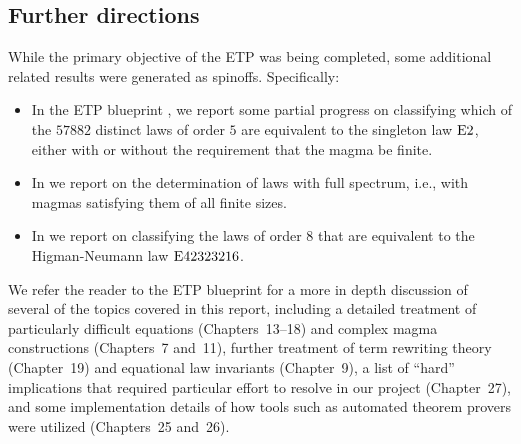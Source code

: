 \subsection{Further directions}

While the primary objective of the ETP was being completed, some additional related results were generated as spinoffs.  Specifically:
\begin{itemize}
\item In the ETP blueprint \cite[Chapter~20]{ETP_blueprint}, we report some partial progress on classifying which of the $\num{57882}$ distinct laws of order $5$ are equivalent to the singleton law $\mathrm{E}2$, either with or without the requirement that the magma be finite.
\item In  we report on the determination of laws with full spectrum, i.e., with magmas satisfying them of all finite sizes.
\item In  we report on classifying the laws of order $8$ that are equivalent to the Higman-Neumann law $\mathrm{E}42323216$.
\end{itemize}

We refer the reader to the ETP blueprint \cite{ETP_blueprint} for a more in depth discussion of several of the topics covered in this report, including a detailed treatment of particularly difficult equations (Chapters~13--18) and complex magma constructions (Chapters~7 and~11), further treatment of term rewriting theory (Chapter~19) and equational law invariants (Chapter~9), a list of ``hard'' implications that required particular effort to resolve in our project (Chapter~27), and some implementation details of how tools such as automated theorem provers were utilized (Chapters~25 and~26).
